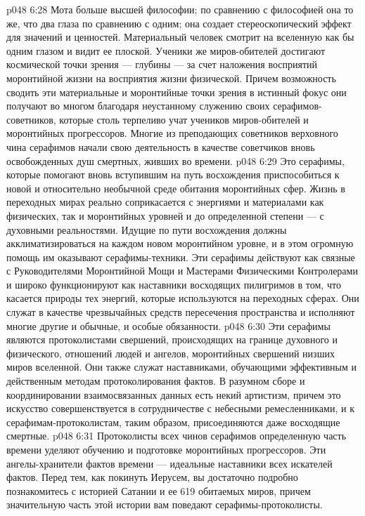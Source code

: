 \vs p048 6:28 Мота больше высшей философии; по сравнению с философией она то же, что два глаза по сравнению с одним; она создает стереоскопический эффект для значений и ценностей. Материальный человек смотрит на вселенную как бы одним глазом и видит ее плоской. Ученики же миров\hyp{}обителей достигают космической точки зрения --- глубины --- за счет наложения восприятий моронтийной жизни на восприятия жизни физической. Причем возможность сводить эти материальные и моронтийные точки зрения в истинный фокус они получают во многом благодаря неустанному служению своих серафимов\hyp{}советников, которые столь терпеливо учат учеников миров\hyp{}обителей и моронтийных прогрессоров. Многие из преподающих советников верховного чина серафимов начали свою деятельность в качестве советчиков вновь освобожденных душ смертных, живших во времени.
\vs p048 6:29 \bibnobreakspace {} Это серафимы, которые помогают вновь вступившим на путь восхождения приспособиться к новой и относительно необычной среде обитания моронтийных сфер. Жизнь в переходных мирах реально соприкасается с энергиями и материалами как физических, так и моронтийных уровней и до определенной степени --- с духовными реальностями. Идущие по пути восхождения должны акклиматизироваться на каждом новом моронтийном уровне, и в этом огромную помощь им оказывают серафимы\hyp{}техники. Эти серафимы действуют как связные с Руководителями Моронтийной Мощи и Мастерами Физическими Контролерами и широко функционируют как наставники восходящих пилигримов в том, что касается природы тех энергий, которые используются на переходных сферах. Они служат в качестве чрезвычайных средств пересечения пространства и исполняют многие другие и обычные, и особые обязанности.
\vs p048 6:30 \bibnobreakspace {} Эти серафимы являются протоколистами свершений, происходящих на границе духовного и физического, отношений людей и ангелов, моронтийных свершений низших миров вселенной. Они также служат наставниками, обучающими эффективным и действенным методам протоколирования фактов. В разумном сборе и координировании взаимосвязанных данных есть некий артистизм, причем это искусство совершенствуется в сотрудничестве с небесными ремесленниками, и к серафимам\hyp{}протоколистам, таким образом, присоединяются даже восходящие смертные.
\vs p048 6:31 Протоколисты всех чинов серафимов определенную часть времени уделяют обучению и подготовке моронтийных прогрессоров. Эти ангелы\hyp{}хранители фактов времени --- идеальные наставники всех искателей фактов. Перед тем, как покинуть Иерусем, вы достаточно подробно познакомитесь с историей Сатании и ее 619 обитаемых миров, причем значительную часть этой истории вам поведают серафимы\hyp{}протоколисты.
